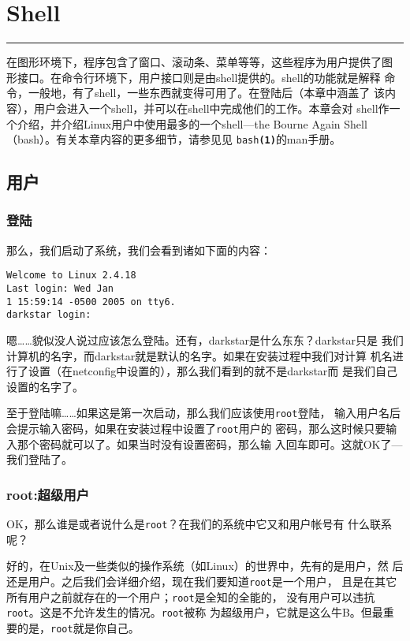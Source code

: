 
\chapter{Shell}
\label{chap:shell}

\rule[0pt]{\textwidth}{0.1pt}

在图形环境下，程序包含了窗口、滚动条、菜单等等，这些程序为用户提供了图
形接口。在命令行环境下，用户接口则是由shell提供的。shell的功能就是解释
命令，一般地，有了shell，一些东西就变得可用了。在登陆后（本章中涵盖了
该内容），用户会进入一个shell，并可以在shell中完成他们的工作。本章会对
shell作一个介绍，并介绍Linux用户中使用最多的一个shell---the Bourne
Again Shell（bash）。有关本章内容的更多细节，请参见见
\texttt{bash\textbf{(1)}}的man手册。

\section{用户}
\label{sec:shell:users}

\subsection{登陆}
\label{sec:shell:users:loggingIn}
那么，我们启动了系统，我们会看到诸如下面的内容：
\begin{Verbatim}[frame=single,commandchars=\\\{\}]
Welcome to Linux 2.4.18
Last login: Wed Jan
1 15:59:14 -0500 2005 on tty6.
darkstar login:
\end{Verbatim}
嗯……貌似没人说过应该怎么登陆。还有，darkstar是什么东东？darkstar只是
我们计算机的名字，而darkstar就是默认的名字。如果在安装过程中我们对计算
机名进行了设置（在netconfig中设置的），那么我们看到的就不是darkstar而
是我们自己设置的名字了。

至于登陆嘛……如果这是第一次启动，那么我们应该使用\texttt{root}登陆，
输入用户名后会提示输入密码，如果在安装过程中设置了\texttt{root}用户的
密码，那么这时候只要输入那个密码就可以了。如果当时没有设置密码，那么输
入回车即可。这就OK了---我们登陆了。

\subsection{root:超级用户}
\label{sec:shell:users:root}
OK，那么谁是或者说什么是\texttt{root}？在我们的系统中它又和用户帐号有
什么联系呢？

好的，在Unix及一些类似的操作系统（如Linux）的世界中，先有的是用户，然
后还是用户。之后我们会详细介绍，现在我们要知道\texttt{root}是一个用户，
且是在其它所有用户之前就存在的一个用户；\texttt{root}是全知的全能的，
没有用户可以违抗\texttt{root}。这是不允许发生的情况。\texttt{root}被称
为超级用户，它就是这么牛B。但最重要的是，\texttt{root}就是你自己。

